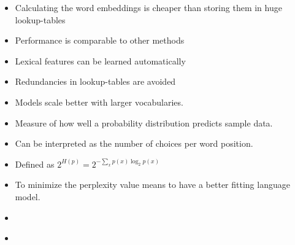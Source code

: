 \documentclass[11pt, a4paper, landscape]{article}
\begin{document}
\NewPage{}

\vfill
\begin{itemize}
\item Calculating the word embeddings is cheaper than storing them in huge lookup-tables
\item Performance is comparable to other methods
\item Lexical features can be learned automatically
\item Redundancies in lookup-tables are avoided
\item Models scale better with larger vocabularies.
\end{itemize}
\vfill


\NewPage{}

\vfill
\begin{itemize}
\item Measure of how well a probability distribution predicts sample data.
\item Can be interpreted as the number of choices per word position.
\item Defined as $2^{H(p)}=2^{-\sum_x p(x)\log_2 p(x)}$
\item To minimize the perplexity value means to have a better fitting language model.
\end{itemize}
\vfill


\NewPage{}

\vfill
\begin{itemize}
\item 
\end{itemize}
\vfill


\NewPage{}

\vfill
\begin{itemize}
\item 
\end{itemize}
\vfill
\end{document}
